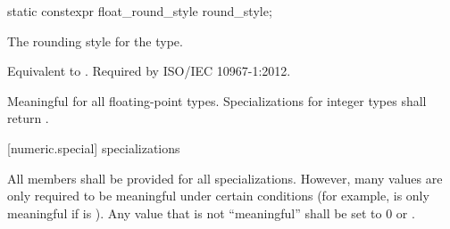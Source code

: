%
\begin{itemdecl}
static constexpr float_round_style round_style;
\end{itemdecl}

\begin{itemdescr}
\pnum
The rounding style for the type.
\begin{footnote}
Equivalent to .
Required by ISO/IEC 10967-1:2012.
\end{footnote}

\pnum
Meaningful for all floating-point types.
Specializations for integer types shall return
.
\end{itemdescr}

[numeric.special]{ specializations}

\pnum
All members shall be provided for all specializations.
However, many values are only required to be meaningful under certain
conditions
(for example,
is only meaningful if
is
).
Any value that is not ``meaningful'' shall be set to 0 or
.

